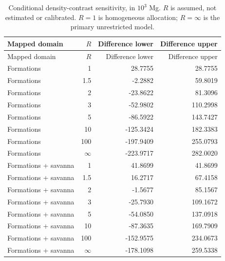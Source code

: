 \begin{longtable}{lrrr}
\caption{Conditional density-contrast sensitivity, in $10^3$ Mg. $R$ is assumed, not estimated or calibrated. $R=1$ is homogeneous allocation; $R=\infty$ is the primary unrestricted model.}\label{tab:contrast}\\
\toprule
Mapped domain & $R$ & Difference lower & Difference upper\\\midrule\endfirsthead
\toprule
Mapped domain & $R$ & Difference lower & Difference upper\\\midrule\endhead
Formations & 1 & 28.7755 & 28.7755\\
Formations & 1.5 & -2.2882 & 59.8019\\
Formations & 2 & -23.8622 & 81.3096\\
Formations & 3 & -52.9802 & 110.2998\\
Formations & 5 & -86.5922 & 143.7427\\
Formations & 10 & -125.3424 & 182.3383\\
Formations & 100 & -197.9409 & 255.0793\\
Formations & $\infty$ & -223.9717 & 282.0020\\
Formations + savanna & 1 & 41.8699 & 41.8699\\
Formations + savanna & 1.5 & 16.2717 & 67.4158\\
Formations + savanna & 2 & -1.5677 & 85.1567\\
Formations + savanna & 3 & -25.7930 & 109.1672\\
Formations + savanna & 5 & -54.0850 & 137.0918\\
Formations + savanna & 10 & -87.3635 & 169.7909\\
Formations + savanna & 100 & -152.9575 & 234.0673\\
Formations + savanna & $\infty$ & -178.1098 & 259.5338\\
\bottomrule
\end{longtable}
